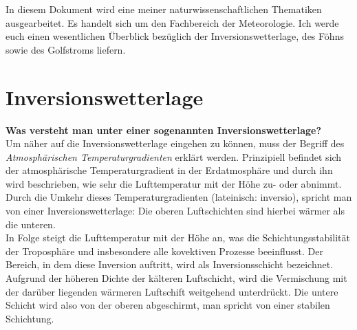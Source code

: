 \documentclass[11pt, a4paper]{article}
\begin{document}
In diesem Dokument wird eine meiner naturwissenschaftlichen Thematiken ausgearbeitet. Es handelt sich um den Fachbereich der Meteorologie. Ich werde euch einen wesentlichen Überblick bezüglich der Inversionswetterlage, des Föhns sowie des Golfstroms liefern.

\section{Inversionswetterlage}

\textbf{Was versteht man unter einer sogenannten Inversionswetterlage?}\\
Um näher auf die Inversionswetterlage eingehen zu können, muss der Begriff des \textit{Atmosphärischen Temperaturgradienten} erklärt werden. Prinzipiell befindet sich der atmosphärische Temperaturgradient in der Erdatmosphäre und durch ihn wird beschrieben, wie sehr die Lufttemperatur mit der Höhe zu- oder abnimmt. \\

Durch die Umkehr dieses Temperaturgradienten (lateinisch: inversio), spricht man von einer Inversionswetterlage: Die oberen Luftschichten sind hierbei wärmer als die unteren. \\

In Folge steigt die Lufttemperatur mit der Höhe an, was die Schichtungsstabilität der Troposphäre und insbesondere alle kovektiven Prozesse beeinflusst. Der Bereich, in dem diese Inversion auftritt, wird als Inversionsschicht bezeichnet.\\

Aufgrund der höheren Dichte der kälteren Luftschicht, wird die Vermischung mit der darüber liegenden wärmeren Luftschift weitgehend unterdrückt. Die untere Schicht wird also von der oberen abgeschirmt, man spricht von einer stabilen Schichtung.




\newpage
\nocite{*}

{}
\end{document}
